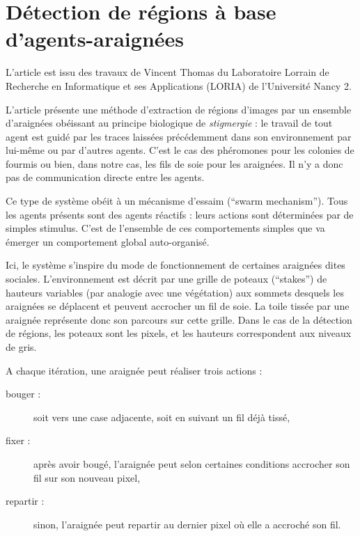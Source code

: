 \section{Détection de régions à base d'agents-araignées}

L'article \cite{spiders} est issu des travaux de Vincent Thomas du Laboratoire Lorrain de Recherche en Informatique et ses Applications (LORIA) de l'Université Nancy 2.

L'article présente une méthode d'extraction de régions d'images par un ensemble d'araignées obéissant au principe biologique de \emph{stigmergie} : le travail de tout agent est guidé par les traces laissées précédemment dans son environnement par lui-même ou par d'autres agents. C'est le cas des phéromones pour les colonies de fourmis ou bien, dans notre cas, les fils de soie pour les araignées. Il n'y a donc pas de communication directe entre les agents.

Ce type de système obéit à un \og{}mécanisme d'essaim \fg{} (``swarm mechanism''). Tous les agents présents sont des agents réactifs : leurs actions sont déterminées par de simples stimulus. C'est de l'ensemble de ces comportements simples que va émerger un comportement global auto-organisé.
 
Ici, le système s'inspire du mode de fonctionnement de certaines araignées dites sociales. L'environnement est décrit par une grille de poteaux (``stakes'') de hauteurs variables (par analogie avec une végétation) aux sommets desquels les araignées se déplacent et peuvent accrocher un fil de soie. La toile tissée par une araignée représente donc son parcours sur cette grille.
Dans le cas de la détection de régions, les poteaux sont les pixels, et les hauteurs correspondent aux niveaux de gris.

A chaque itération, une araignée peut réaliser trois actions :
\begin{description}
  \item[bouger :] soit vers une case adjacente, soit en suivant un fil déjà tissé,
  \item[fixer :] après avoir bougé, l'araignée peut selon certaines conditions accrocher son fil sur son nouveau pixel,
  \item[repartir :] sinon, l'araignée peut repartir au dernier pixel où elle a accroché son fil.
\end{description}

